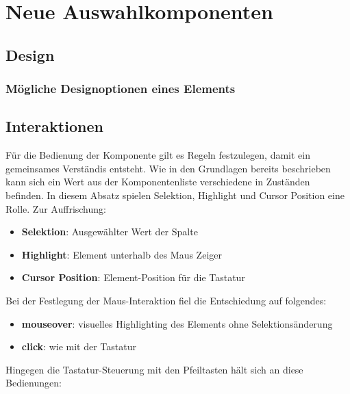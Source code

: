 \chapter{Neue Auswahlkomponenten}

\section{Design}

\subsection{Mögliche Designoptionen eines Elements}



\section{Interaktionen}

Für die Bedienung der Komponente gilt es Regeln festzulegen, damit ein gemeinsames Verständis entsteht.
Wie in den Grundlagen bereits beschrieben kann sich ein Wert aus der Komponentenliste verschiedene in Zuständen befinden.
In diesem Absatz spielen Selektion, Highlight und Cursor Position eine Rolle.
Zur Auffrischung: 

\begin{itemize}
    \item \textbf{Selektion}: Ausgewählter Wert der Spalte
    \item \textbf{Highlight}: Element unterhalb des Maus Zeiger
    \item \textbf{Cursor Position}: Element-Position für die Tastatur
\end{itemize}

\noindent
Bei der Festlegung der Maus-Interaktion fiel die Entschiedung auf folgendes:

\begin{itemize}
    \item \textbf{mouseover}: visuelles Highlighting des Elements ohne Selektionsänderung
    \item \textbf{click}: wie mit der Tastatur
\end{itemize}

\noindent
Hingegen die Tastatur-Steuerung mit den Pfeiltasten hält sich an diese Bedienungen:

